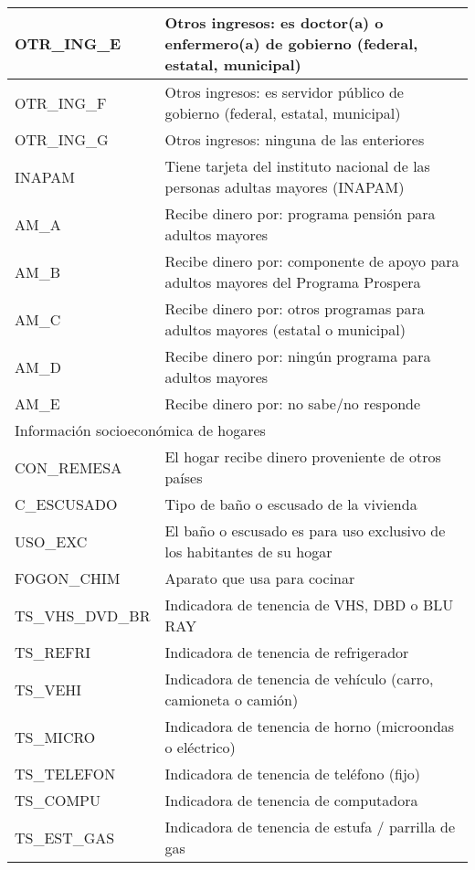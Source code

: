 \begin{longtable}{|p{8cm}|p{8cm}|}
    \hline
    OTR\_ING\_E & Otros ingresos: es doctor(a) o enfermero(a) de gobierno (federal, estatal, municipal)\\
    \hline
    OTR\_ING\_F & Otros ingresos: es servidor público de gobierno (federal, estatal, municipal)\\
    \hline
    OTR\_ING\_G & Otros ingresos: ninguna de las enteriores\\
    \hline
    INAPAM & Tiene tarjeta del instituto nacional de las personas adultas mayores (INAPAM)\\
    \hline
    AM\_A & Recibe dinero por: programa pensión para adultos mayores \\
    \hline
    AM\_B & Recibe dinero por: componente de apoyo para adultos mayores del Programa Prospera\\
    \hline
    AM\_C & Recibe dinero por: otros programas para adultos mayores (estatal o municipal)\\
    \hline
    AM\_D & Recibe dinero por: ningún programa para adultos mayores\\
    \hline
    AM\_E & Recibe dinero por: no sabe/no responde\\
    \hline
    \hline
    \multicolumn{2}{l}{Información socioeconómica de hogares}\\
    \hline
    CON\_REMESA & El hogar recibe dinero proveniente de otros países \\
    \hline
    C\_ESCUSADO & Tipo de baño o escusado de la vivienda \\
    \hline
    USO\_EXC & El baño o escusado es para uso exclusivo de los habitantes de su hogar \\
    \hline
    FOGON\_CHIM & Aparato que usa para cocinar \\
    \hline
    TS\_VHS\_DVD\_BR & Indicadora de tenencia de VHS, DBD o BLU RAY \\
    \hline
    TS\_REFRI & Indicadora de tenencia de refrigerador \\
    \hline
    TS\_VEHI & Indicadora de tenencia de vehículo (carro, camioneta o camión) \\
    \hline
    TS\_MICRO & Indicadora de tenencia de horno (microondas o eléctrico) \\
    \hline
    TS\_TELEFON & Indicadora de tenencia de teléfono (fijo) \\
    \hline
    TS\_COMPU & Indicadora de tenencia de computadora\\
    \hline
    TS\_EST\_GAS & Indicadora de tenencia de estufa / parrilla de gas\\

\end{longtable}
